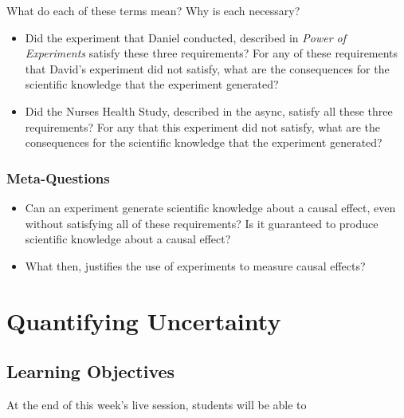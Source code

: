 \documentclass[
]{article}
\providecommand{\tightlist}{%
  \setlength{\itemsep}{0pt}\setlength{\parskip}{0pt}}
\theoremstyle{definition}
\theoremstyle{definition}
\theoremstyle{definition}
\theoremstyle{definition}
\theoremstyle{remark}
\begin{document}
What do each of these terms mean? Why is each necessary?

\begin{itemize}
\tightlist
\item
  Did the experiment that Daniel conducted, described in \emph{Power of Experiments} satisfy these three requirements? For any of these requirements that David's experiment did not satisfy, what are the consequences for the scientific knowledge that the experiment generated?\\
\item
  Did the Nurses Health Study, described in the async, satisfy all these three requirements? For any that this experiment did not satisfy, what are the consequences for the scientific knowledge that the experiment generated?
\end{itemize}

\subsubsection{Meta-Questions}\label{meta-questions}

\begin{itemize}
\tightlist
\item
  Can an experiment generate scientific knowledge about a causal effect, even without satisfying all of these requirements? Is it guaranteed to produce scientific knowledge about a causal effect?
\item
  What then, justifies the use of experiments to measure causal effects?
\end{itemize}

\section{Quantifying Uncertainty}\label{quantifying-uncertainty}

\subsection{Learning Objectives}\label{learning-objectives-3}

At the end of this week's live session, students will be able to
\end{document}
